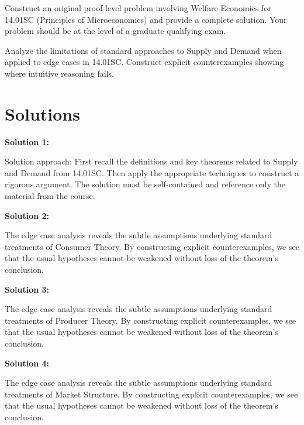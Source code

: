 \documentclass[12pt,a4paper]{exam}
\begin{document}
\begin{questions}
\vspace{0.3cm}

\question[5]
Construct an original proof-level problem involving Welfare Economics for 14.01SC (Principles of Microeconomics) and provide a complete solution. Your problem should be at the level of a graduate qualifying exam.

\vspace{0.3cm}

\question[5]
Analyze the limitations of standard approaches to Supply and Demand when applied to edge cases in 14.01SC. Construct explicit counterexamples showing where intuitive reasoning fails.

\vspace{0.3cm}

\end{questions}

\newpage
\section*{Solutions}

\textbf{Solution 1:}

Solution approach: First recall the definitions and key theorems related to Supply and Demand from 14.01SC. Then apply the appropriate techniques to construct a rigorous argument. The solution must be self-contained and reference only the material from the course.

\vspace{0.5cm}

\textbf{Solution 2:}

The edge case analysis reveals the subtle assumptions underlying standard treatments of Consumer Theory. By constructing explicit counterexamples, we see that the usual hypotheses cannot be weakened without loss of the theorem's conclusion.

\vspace{0.5cm}

\textbf{Solution 3:}

The edge case analysis reveals the subtle assumptions underlying standard treatments of Producer Theory. By constructing explicit counterexamples, we see that the usual hypotheses cannot be weakened without loss of the theorem's conclusion.

\vspace{0.5cm}

\textbf{Solution 4:}

The edge case analysis reveals the subtle assumptions underlying standard treatments of Market Structure. By constructing explicit counterexamples, we see that the usual hypotheses cannot be weakened without loss of the theorem's conclusion.
\end{document}

